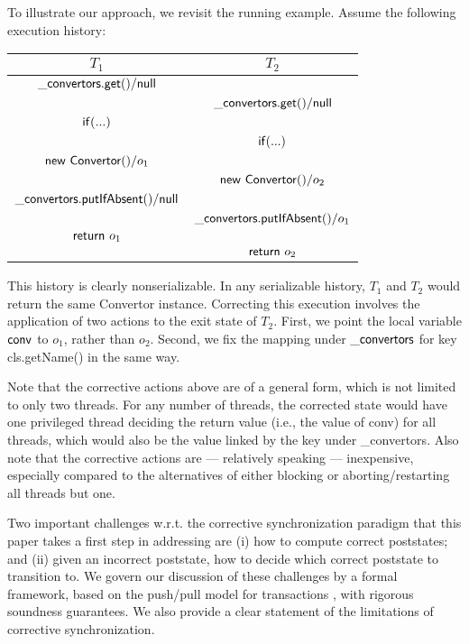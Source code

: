 To illustrate our approach, we revisit the running example. Assume the following execution history:
\begin{center}
	\begin{tabular}{c||c}
		$T_1$ & $T_2$ \\
		\hline
		${\sf \_convertors.get()} / {\sf null}$ &  \\
															  & ${\sf \_convertors.get()} / {\sf null}$ \\
		${\sf if (...)}$ 								   &							\\
															  & ${\sf if (...)}$ \\
		${\sf new\ Convertor()} / o_1$		& \\
															  & ${\sf new\ Convertor()} / o_2$ \\
		${\sf \_convertors.putIfAbsent()} / {\sf null}$ &  \\
									& 		${\sf \_convertors.putIfAbsent()} / o_1$ \\
		${\sf return}\ o_1$ & \\
									& ${\sf return}\ o_2$ \\
	\end{tabular}
\end{center}
This history is clearly nonserializable. In any serializable history, $T_1$ and $T_2$ would return the same {\sf Convertor} instance. Correcting this execution involves the application of two actions to the exit state of $T_2$. First, we point the local variable ${\sf conv}$ to $o_1$, rather than $o_2$. Second, we fix the mapping under ${\sf \_convertors}$ for key {\sf cls.getName()} in the same way.

Note that the corrective actions above are of a general form, which is not limited to only two threads. For any number of threads, the corrected state would have one privileged thread deciding the return value (i.e., the value of {\sf conv}) for all threads, which would also be the value linked by the key under {\sf \_convertors}. Also note that the corrective actions are --- relatively speaking --- inexpensive, especially compared to the alternatives of either blocking or aborting/restarting all threads but one.

Two important challenges w.r.t. the corrective synchronization paradigm that this paper takes a first step in addressing are (i) how to compute correct poststates; and (ii) given an incorrect poststate, how to decide which correct poststate to transition to. We govern our discussion of these challenges by a formal framework, based on the push/pull model for transactions \cite{KoskinenP15}, with rigorous soundness guarantees. We also provide a clear statement of the limitations of corrective synchronization.

